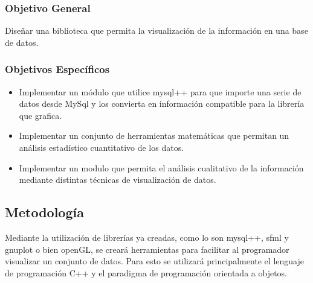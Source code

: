 \documentclass[11pt]{article}
\begin{document}
\subsubsection*{Objetivo General}
Diseñar una biblioteca que permita la visualización de la información en una base de datos.

\subsubsection*{Objetivos Específicos}
\begin{itemize}
\item Implementar un módulo que utilice mysql++ para que importe una serie de datos desde MySql 
      y los convierta en información compatible para la librería que grafica.
\item Implementar un conjunto de herramientas matemáticas que permitan un análisis
	  estadístico cuantitativo de los datos.
\item Implementar un modulo que permita el análisis cualitativo de la información mediante 
	  distintas técnicas de visualización de datos.
\end{itemize}

\subsection*{Metodología}
Mediante la utilización de librerías ya creadas, como lo son mysql++, sfml 
y gnuplot o bien openGL, se creará herramientas para facilitar al programador 
visualizar un conjunto de datos. Para esto se utilizará principalmente el
lenguaje de programación C++ y el paradigma de programación orientada a objetos.
\end{document}
